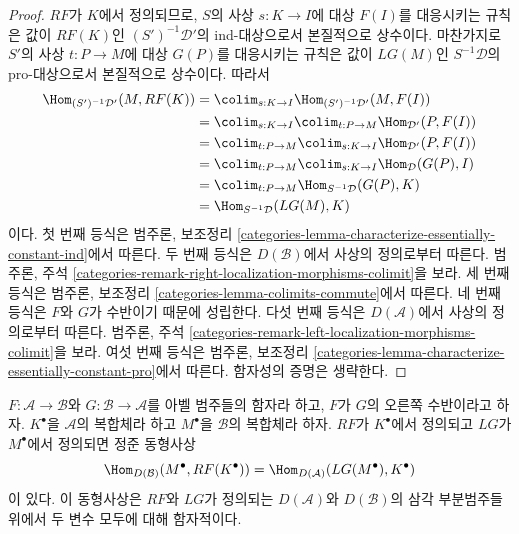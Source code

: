 \begin{proof}
$RF$가 $K$에서 정의되므로, $S$의 사상 $s : K \to I$에 대상
$F(I)$를 대응시키는 규칙은 값이 $RF(K)$인
$(S')^{-1}\mathcal{D}'$의 ind-대상으로서 본질적으로 상수이다.
마찬가지로 $S'$의 사상 $t : P \to M$에 대상 $G(P)$를 대응시키는
규칙은 값이 $LG(M)$인 $S^{-1}\mathcal{D}$의 pro-대상으로서
본질적으로 상수이다. 따라서
\begin{align*}
\Hom_{(S')^{-1}\mathcal{D}'}(M, RF(K))
& =
\colim_{s : K \to I} \Hom_{(S')^{-1}\mathcal{D}'}(M, F(I)) \\
& =
\colim_{s : K \to I} \colim_{t : P \to M} \Hom_{\mathcal{D}'}(P, F(I)) \\
& =
\colim_{t : P \to M} \colim_{s : K \to I} \Hom_{\mathcal{D}'}(P, F(I)) \\
& =
\colim_{t : P \to M} \colim_{s : K \to I} \Hom_{\mathcal{D}}(G(P), I) \\
& =
\colim_{t : P \to M} \Hom_{S^{-1}\mathcal{D}}(G(P), K) \\
& =
\Hom_{S^{-1}\mathcal{D}}(LG(M), K)
\end{align*}
이다. 첫 번째 등식은 범주론, 보조정리
\ref{categories-lemma-characterize-essentially-constant-ind}에서
따른다.
두 번째 등식은 $D(\mathcal{B})$에서 사상의 정의로부터 따른다.
범주론, 주석
\ref{categories-remark-right-localization-morphisms-colimit}을 보라.
세 번째 등식은 범주론, 보조정리
\ref{categories-lemma-colimits-commute}에서 따른다.
네 번째 등식은 $F$와 $G$가 수반이기 때문에 성립한다.
다섯 번째 등식은 $D(\mathcal{A})$에서 사상의 정의로부터 따른다.
범주론, 주석
\ref{categories-remark-left-localization-morphisms-colimit}을 보라.
여섯 번째 등식은 범주론, 보조정리
\ref{categories-lemma-characterize-essentially-constant-pro}에서
따른다. 함자성의 증명은 생략한다.
\end{proof}

\begin{lemma}
\label{lemma-pre-derived-adjoint-functors}
$F : \mathcal{A} \to \mathcal{B}$와
$G : \mathcal{B} \to \mathcal{A}$를 아벨 범주들의 함자라 하고,
$F$가 $G$의 오른쪽 수반이라고 하자.
$K^\bullet$을 $\mathcal{A}$의 복합체라 하고
$M^\bullet$을 $\mathcal{B}$의 복합체라 하자.
$RF$가 $K^\bullet$에서 정의되고 $LG$가 $M^\bullet$에서 정의되면
정준 동형사상
$$
\Hom_{D(\mathcal{B})}(M^\bullet, RF(K^\bullet)) =
\Hom_{D(\mathcal{A})}(LG(M^\bullet), K^\bullet)
$$
이 있다. 이 동형사상은 $RF$와 $LG$가 정의되는
$D(\mathcal{A})$와 $D(\mathcal{B})$의 삼각 부분범주들 위에서
두 변수 모두에 대해 함자적이다.
\end{lemma}

